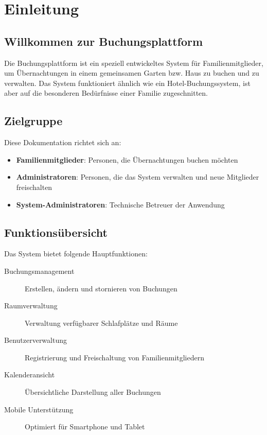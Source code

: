 \section{Einleitung}
\label{sec:einleitung}

\subsection{Willkommen zur Buchungsplattform}

Die Buchungsplattform ist ein speziell entwickeltes System für Familienmitglieder, um Übernachtungen in einem gemeinsamen Garten bzw. Haus zu buchen und zu verwalten. Das System funktioniert ähnlich wie ein Hotel-Buchungssystem, ist aber auf die besonderen Bedürfnisse einer Familie zugeschnitten.

\subsection{Zielgruppe}

Diese Dokumentation richtet sich an:

\begin{itemize}
    \item \textbf{Familienmitglieder}: Personen, die Übernachtungen buchen möchten
    \item \textbf{Administratoren}: Personen, die das System verwalten und neue Mitglieder freischalten
    \item \textbf{System-Administratoren}: Technische Betreuer der Anwendung
\end{itemize}

\subsection{Funktionsübersicht}

Das System bietet folgende Hauptfunktionen:

\begin{description}
    \item[Buchungsmanagement] Erstellen, ändern und stornieren von Buchungen
    \item[Raumverwaltung] Verwaltung verfügbarer Schlafplätze und Räume
    \item[Benutzerverwaltung] Registrierung und Freischaltung von Familienmitgliedern
    \item[Kalenderansicht] Übersichtliche Darstellung aller Buchungen
    \item[Mobile Unterstützung] Optimiert für Smartphone und Tablet
\end{description}

